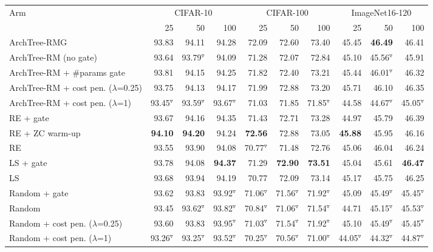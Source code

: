 \begin{tabular}{@{}lrrrrrrrrr@{}}
\toprule
\multirow{2}{*}{Arm} & \multicolumn{3}{c}{CIFAR-10} & \multicolumn{3}{c}{CIFAR-100} & \multicolumn{3}{c}{ImageNet16-120}\\
\cmidrule(lr){2-4}\cmidrule(lr){5-7}\cmidrule(lr){8-10}
 & 25 & 50 & 100 & 25 & 50 & 100 & 25 & 50 & 100\\
\midrule
ArchTree-RMG & 93.83 & 94.11 & 94.28 & 72.09 & 72.60 & 73.40 & 45.45 & \textbf{46.49} & 46.41\\
ArchTree-RM (no gate) & 93.64 & 93.79$^{\triangledown}$ & 94.09 & 71.28 & 72.07 & 72.84 & 45.10 & 45.56$^{\triangledown}$ & 45.91\\
ArchTree-RM + \#params gate & 93.81 & 94.15 & 94.25 & 71.82 & 72.40 & 73.21 & 45.44 & 46.01$^{\triangledown}$ & 46.32\\
ArchTree-RM + cost pen. ($\lambda$=0.25) & 93.75 & 94.13 & 94.17 & 71.99 & 72.88 & 73.20 & 45.71 & 46.10 & 46.35\\
ArchTree-RM + cost pen. ($\lambda$=1) & 93.45$^{\triangledown}$ & 93.59$^{\triangledown}$ & 93.67$^{\triangledown}$ & 71.03 & 71.85 & 71.85$^{\triangledown}$ & 44.58 & 44.67$^{\triangledown}$ & 45.05$^{\triangledown}$\\
RE + gate & 93.67 & 94.16 & 94.35 & 71.43 & 72.71 & 73.28 & 44.97 & 45.79 & 46.39\\
RE + ZC warm-up & \textbf{94.10} & \textbf{94.20} & 94.24 & \textbf{72.56} & 72.88 & 73.05 & \textbf{45.88} & 45.95 & 46.16\\
RE & 93.55 & 93.90 & 94.08 & 70.77$^{\triangledown}$ & 71.48 & 72.76 & 45.06 & 46.04 & 46.24\\
LS + gate & 93.78 & 94.08 & \textbf{94.37} & 71.29 & \textbf{72.90} & \textbf{73.51} & 45.04 & 45.61 & \textbf{46.47}\\
LS & 93.68 & 93.94 & 94.19 & 70.77 & 72.09 & 73.14 & 45.17 & 45.75 & 46.25\\
Random + gate & 93.62 & 93.83 & 93.92$^{\triangledown}$ & 71.06$^{\triangledown}$ & 71.56$^{\triangledown}$ & 71.92$^{\triangledown}$ & 45.09 & 45.49$^{\triangledown}$ & 45.45$^{\triangledown}$\\
Random & 93.45 & 93.62$^{\triangledown}$ & 93.82$^{\triangledown}$ & 70.84$^{\triangledown}$ & 71.06$^{\triangledown}$ & 71.54$^{\triangledown}$ & 44.71 & 45.15$^{\triangledown}$ & 45.53$^{\triangledown}$\\
Random + cost pen. ($\lambda$=0.25) & 93.60 & 93.83 & 93.95$^{\triangledown}$ & 71.03$^{\triangledown}$ & 71.54$^{\triangledown}$ & 71.92$^{\triangledown}$ & 45.10 & 45.49$^{\triangledown}$ & 45.45$^{\triangledown}$\\
Random + cost pen. ($\lambda$=1) & 93.26$^{\triangledown}$ & 93.25$^{\triangledown}$ & 93.52$^{\triangledown}$ & 70.25$^{\triangledown}$ & 70.56$^{\triangledown}$ & 71.00$^{\triangledown}$ & 44.05$^{\triangledown}$ & 44.32$^{\triangledown}$ & 44.87$^{\triangledown}$\\
\bottomrule
\end{tabular}
